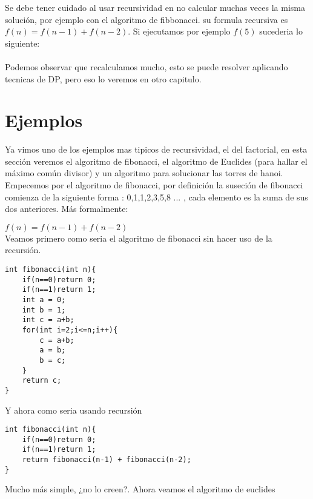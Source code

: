 Se debe tener cuidado al usar recursividad en no calcular muchas veces la misma solución, por ejemplo
con el algoritmo de fibbonacci. su formula recursiva es $f(n) = f(n-1) + f(n-2)$. Si ejecutamos por ejemplo $f(5)$ sucederia lo siguiente:
\\
\\Podemos observar que recalculamos mucho, esto se puede resolver aplicando tecnicas de DP, pero eso lo veremos en otro capitulo.

\section{Ejemplos}

Ya vimos uno de los ejemplos mas tipicos de recursividad, el del factorial, en esta sección veremos
el algoritmo de fibonacci, el algoritmo de Euclides (para hallar el máximo común divisor) y
un algoritmo para solucionar las torres de hanoi.
\\Empecemos por el algoritmo de fibonacci, por definición la suseción de fibonacci comienza de la
siguiente forma : 0,1,1,2,3,5,8 ... , cada elemento es la suma de sus dos anteriores. Más  formalmente:

$f(n) = f(n-1) + f(n-2)$
\\Veamos primero como seria el algoritmo de fibonacci sin hacer uso de la recursión.

\begin{minipage}{\textwidth}
\begin{lstlisting}[style=C,caption=fibonacciIterativo.cpp]
int fibonacci(int n){
    if(n==0)return 0;
    if(n==1)return 1;
    int a = 0;
    int b = 1;
    int c = a+b;
    for(int i=2;i<=n;i++){
        c = a+b;
        a = b;
        b = c;
    }
    return c;
}
\end{lstlisting}
\end{minipage}

Y ahora como seria usando recursión

\begin{minipage}{\textwidth}
\begin{lstlisting}[style=C,caption=fibonacciRecursivo.cpp]
int fibonacci(int n){
    if(n==0)return 0;
    if(n==1)return 1;
    return fibonacci(n-1) + fibonacci(n-2);
}
\end{lstlisting}
\end{minipage}

Mucho más simple, ¿no lo creen?. Ahora veamos el algoritmo de euclides


